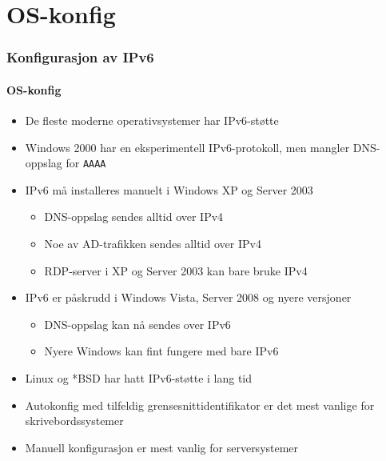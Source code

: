\section{OS-konfig}
\begin{frame}%
  \frametitle{Konfigurasjon av IPv6}
  \framesubtitle{OS-konfig}
  \pause
  \begin{itemize}[<+->]
  \item De fleste moderne operativsystemer har IPv6-støtte
  \item Windows 2000 har en eksperimentell IPv6-protokoll, men mangler
    DNS-oppslag for \texttt{AAAA}
  \item IPv6 må installeres manuelt i Windows XP og Server 2003
    \begin{itemize}[<+->]
    \item DNS-oppslag sendes alltid over \alert{IPv4}
    \item Noe av AD-trafikken sendes alltid over \alert{IPv4}
    \item RDP-server i XP og Server 2003 kan bare bruke \alert{IPv4}
    \end{itemize}
  \item IPv6 er påskrudd i Windows Vista, Server 2008 og nyere versjoner
    \begin{itemize}[<+->]
    \item DNS-oppslag kan nå sendes over IPv6
    \item Nyere Windows kan fint fungere med bare IPv6
    \end{itemize}
  \item Linux og *BSD har hatt IPv6-støtte i lang tid
  \item Autokonfig med tilfeldig grensesnittidentifikator er det mest
    vanlige for skrivebordssystemer
  \item Manuell konfigurasjon er mest vanlig for serversystemer
  \end{itemize}
\end{frame}

